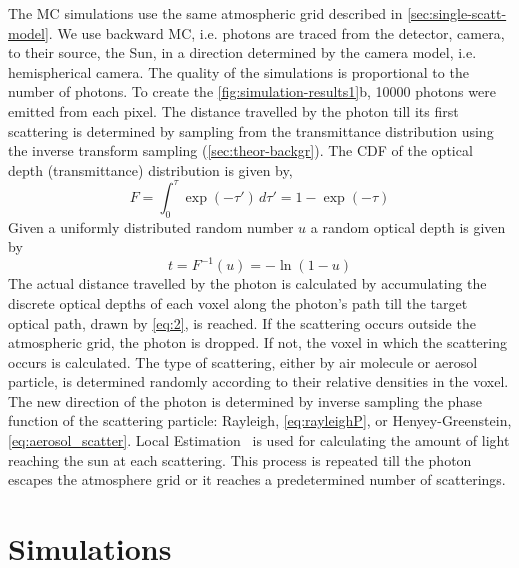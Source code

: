 \documentclass[10pt,letterpaper]{article}
\newcommand{\derivsym}[1]{\,d{#1}}
\begin{document}
The MC simulations use the same atmospheric grid described in
\cref{sec:single-scatt-model}. We use backward MC, i.e. photons are
traced from the detector, camera, to their source, the Sun, in a
direction determined by the camera model, i.e. hemispherical
camera. The quality of the simulations is proportional to the number
of photons. To create the \cref{fig:simulation-results1}b, \num{10000}
photons were emitted from each pixel. The distance travelled by the
photon till its first scattering is determined by sampling from the
transmittance distribution using the inverse transform sampling
(\cref{sec:theor-backgr}).  The CDF of the optical depth
(transmittance) distribution is given by,
\begin{equation}
  \label{eq:1}
  F=\int_{0}^{\tau}\exp(-\tau')\derivsym{\tau'}=1-\exp(-\tau)
\end{equation}
Given a uniformly distributed random number $u$ a random optical depth
is given by
\begin{equation}
  \label{eq:2}
  t=F^{-1}(u)=-\ln(1-u)
\end{equation}
The actual distance travelled by the photon is calculated by
accumulating the discrete optical depths of each voxel along the
photon's path till the target optical path, drawn by \cref{eq:2}, is
reached.  If the scattering occurs outside the atmospheric grid, the
photon is dropped. If not, the voxel in which the scattering occurs is
calculated.  The type of scattering, either by air molecule or aerosol
particle, is determined randomly according to their relative densities
in the voxel.  The new direction of the photon is determined by
inverse sampling the phase function of the scattering particle:
Rayleigh, \cref{eq:rayleighP}, or Henyey-Greenstein,
\cref{eq:aerosol_scatter}.  Local Estimation~\cite{marshak20053d} is
used for calculating the amount of light reaching the sun at each
scattering.  This process is repeated till the photon escapes the
atmosphere grid or it reaches a predetermined number of scatterings.


\section{Simulations}
\label{sec:simul}
\end{document}
